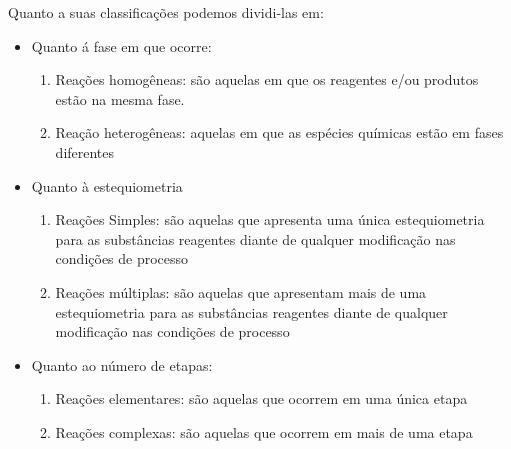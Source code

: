 Quanto a suas classificações podemos dividi-las em:
\begin{itemize}
    \item { Quanto á fase em que ocorre:
        \begin{enumerate}
            \item Reações homogêneas: são aquelas em que os reagentes e/ou produtos estão na mesma fase.
            \item {Reação heterogêneas: aquelas em que as espécies químicas estão em fases diferentes}
        \end{enumerate}
    }
    \item {Quanto à estequiometria
        \begin{enumerate}
            \item {Reações Simples: são aquelas que apresenta uma única estequiometria para as substâncias
            reagentes diante de qualquer modificação nas condições de processo}
            \item {Reações múltiplas: são aquelas que apresentam mais de uma estequiometria para as substâncias
            reagentes diante de qualquer modificação nas condições de processo}\
        \end{enumerate}
    }
    \item {Quanto ao número de etapas:
        \begin{enumerate}
            \item {Reações elementares: são aquelas que ocorrem em uma única etapa}
            \item {Reações complexas: são aquelas que ocorrem em mais de uma etapa}
        \end{enumerate}
    }
\end{itemize}
